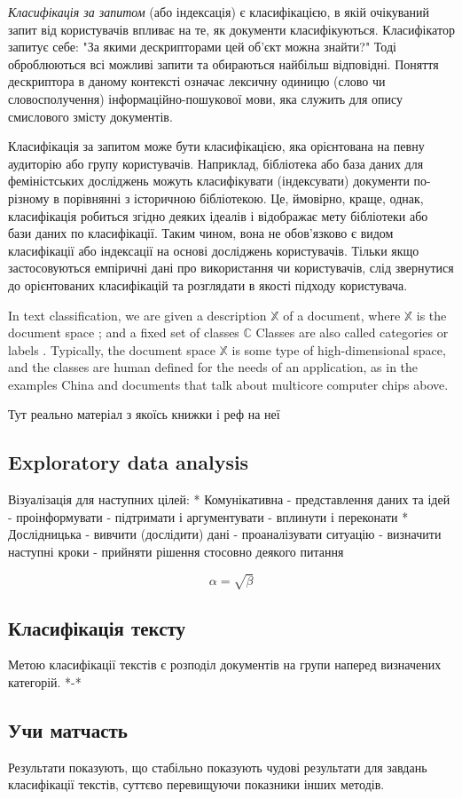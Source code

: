 \textit{Класифікація за запитом} (або індексація) є класифікацією, в якій очікуваний запит від користувачів впливає на те, як документи класифікуються. Класифікатор запитує себе: "За якими дескрипторами цей об'єкт можна знайти?" Тоді оброблюються всі можливі запити та обираються найбільш відповідні. Поняття дескриптора в даному контексті означає лексичну одиницю (слово чи словосполучення) інформаційно-пошукової мови, яка служить для опису смислового змісту документів.

Класифікація за запитом може бути класифікацією, яка орієнтована на певну аудиторію або групу користувачів. Наприклад, бібліотека або база даних для феміністських досліджень можуть класифікувати (індексувати) документи по-різному в порівнянні з історичною бібліотекою. Це, ймовірно, краще, однак, класифікація робиться згідно деяких ідеалів і відображає мету бібліотеки або бази даних по класифікації. Таким чином, вона не обов'язково є видом класифікації або індексації на основі досліджень користувачів. Тільки якщо застосовуються емпіричні дані про використання чи користувачів, слід звернутися до орієнтованих класифікацій та розглядати в якості підходу користувача.

In text classification, we are given a description
$\mathbb{X}$ of a document, where $\mathbb{X}$ is the document space ; and a fixed set
of classes  $\mathbb{C}$ Classes are also called categories or
labels . Typically, the document space  $\mathbb{X}$ is some type of high-dimensional space,
and the classes are human defined for the needs of an application, as in the examples China
and documents that talk about multicore computer chips above.


Тут реально матеріал з якоїсь книжки і реф на неї \cite{book:1}

\subsection{Exploratory data analysis}
Візуалізація для наступних цілей:
* Комунікативна
- представлення даних та ідей
- проінформувати
- підтримати і аргументувати
- вплинути і переконати
* Дослідницька
- вивчити (дослідити) дані
- проаналізувати ситуацію
- визначити наступні кроки
- прийняти рішення стосовно деякого питання

\begin{equation}
    \label{simple_equation}
    \alpha = \sqrt{ \beta }
\end{equation}

\subsection{Класифікація тексту}
Метою класифікації текстів є розподіл документів на групи наперед визначених категорій. *-*


\subsection{Учи матчасть}
Результати показують, що стабільно показують чудові результати для завдань класифікації
текстів, суттєво перевищуючи показники інших методів.

